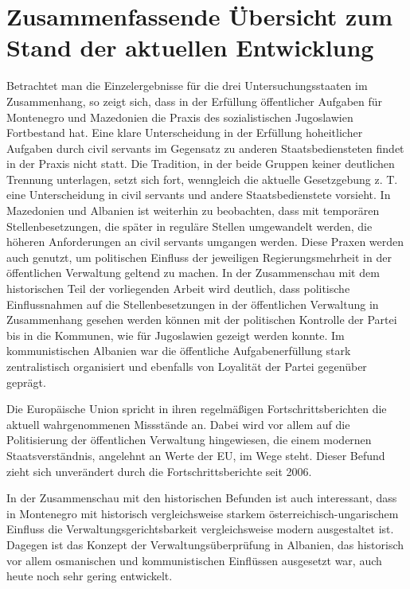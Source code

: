 \section{Zusammenfassende Übersicht zum Stand der aktuellen Entwicklung }

Betrachtet man die Einzelergebnisse für die drei Untersuchungsstaaten im Zusammenhang, so zeigt sich, dass in der Erfüllung öffentlicher Aufgaben für Montenegro und Mazedonien die Praxis des sozialistischen Jugoslawien Fortbestand hat. Eine klare Unterscheidung in der Erfüllung hoheitlicher Aufgaben durch civil servants im Gegensatz zu anderen Staatsbediensteten findet in der Praxis nicht statt. Die Tradition, in der beide Gruppen keiner deutlichen Trennung unterlagen, setzt sich fort, wenngleich die aktuelle Gesetzgebung z. T. eine Unterscheidung in civil servants und andere Staatsbedienstete vorsieht. In Mazedonien und Albanien ist weiterhin zu beobachten, dass mit temporären Stellenbesetzungen, die später in reguläre Stellen umgewandelt werden, die höheren Anforderungen an civil servants umgangen werden. Diese Praxen werden auch genutzt, um politischen Einfluss der jeweiligen Regierungsmehrheit in der öffentlichen Verwaltung geltend zu machen. In der Zusammenschau mit dem historischen Teil der vorliegenden Arbeit wird deutlich, dass politische Einflussnahmen auf die Stellenbesetzungen in der öffentlichen Verwaltung in Zusammenhang gesehen werden können mit der politischen Kontrolle der Partei bis in die Kommunen, wie für Jugoslawien gezeigt werden konnte. Im kommunistischen Albanien war die öffentliche Aufgabenerfüllung stark zentralistisch organisiert und ebenfalls von Loyalität der Partei gegenüber geprägt. \par
Die Europäische Union spricht in ihren regelmäßigen Fortschrittsberichten die aktuell wahrgenommenen Missstände an. Dabei wird vor allem auf die Politisierung der öffentlichen Verwaltung hingewiesen, die einem modernen Staatsverständnis, angelehnt an Werte der EU, im Wege steht. Dieser Befund zieht sich unverändert durch die Fortschrittsberichte seit 2006.\par
In der Zusammenschau mit den historischen Befunden ist auch interessant, dass in Montenegro mit historisch vergleichsweise starkem österreichisch-ungarischem Einfluss die Verwaltungsgerichtsbarkeit vergleichsweise modern ausgestaltet ist. Dagegen ist das Konzept der Verwaltungsüberprüfung in Albanien, das historisch vor allem osmanischen und kommunistischen Einflüssen ausgesetzt war, auch heute noch sehr gering entwickelt.\par
